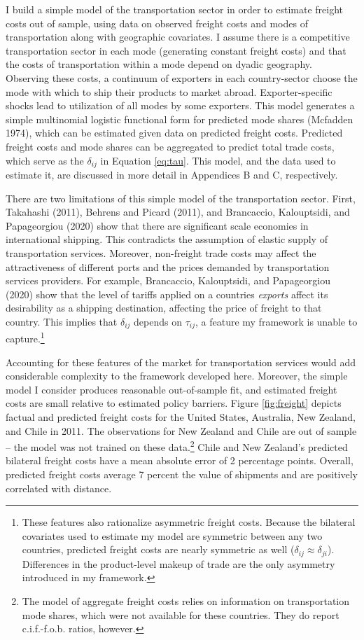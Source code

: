 \documentclass{puthesis}
\begin{document}
I build a simple model of the transportation sector in order to estimate
freight costs out of sample, using data on observed freight costs and
modes of transportation along with geographic covariates. I assume there
is a competitive transportation sector in each mode (generating constant
freight costs) and that the costs of transportation within a mode depend
on dyadic geography. Observing these costs, a continuum of exporters in
each country-sector choose the mode with which to ship their products to
market abroad. Exporter-specific shocks lead to utilization of all modes
by some exporters. This model generates a simple multinomial logistic
functional form for predicted mode shares (Mcfadden 1974), which can be
estimated given data on predicted freight costs. Predicted freight costs
and mode shares can be aggregated to predict total trade costs, which
serve as the \(\delta_{ij}\) in Equation \ref{eq:tau}. This model, and
the data used to estimate it, are discussed in more detail in Appendices
B and C, respectively.

There are two limitations of this simple model of the transportation
sector. First, Takahashi (2011), Behrens and Picard (2011), and
Brancaccio, Kalouptsidi, and Papageorgiou (2020) show that there are
significant scale economies in international shipping. This contradicts
the assumption of elastic supply of transportation services. Moreover,
non-freight trade costs may affect the attractiveness of different ports
and the prices demanded by transportation services providers. For
example, Brancaccio, Kalouptsidi, and Papageorgiou (2020) show that the
level of tariffs applied on a countries \emph{exports} affect its
desirability as a shipping destination, affecting the price of freight
to that country. This implies that \(\delta_{ij}\) depends on
\(\tau_{ij}\), a feature my framework is unable to capture.\footnote{These
  features also rationalize asymmetric freight costs. Because the
  bilateral covariates used to estimate my model are symmetric between
  any two countries, predicted freight costs are nearly symmetric as
  well (\(\delta_{ij} \approx \delta_{ji}\)). Differences in the
  product-level makeup of trade are the only asymmetry introduced in my
  framework.}

Accounting for these features of the market for transportation services
would add considerable complexity to the framework developed here.
Moreover, the simple model I consider produces reasonable out-of-sample
fit, and estimated freight costs are small relative to estimated policy
barriers. Figure \ref{fig:freight} depicts factual and predicted freight
costs for the United States, Australia, New Zealand, and Chile in 2011.
The observations for New Zealand and Chile are out of sample -- the
model was not trained on these data.\footnote{The model of aggregate
  freight costs relies on information on transportation mode shares,
  which were not available for these countries. They do report
  c.i.f.-f.o.b. ratios, however.} Chile and New Zealand's predicted
bilateral freight costs have a mean absolute error of 2 percentage
points. Overall, predicted freight costs average 7 percent the value of
shipments and are positively correlated with distance.
\end{document}
